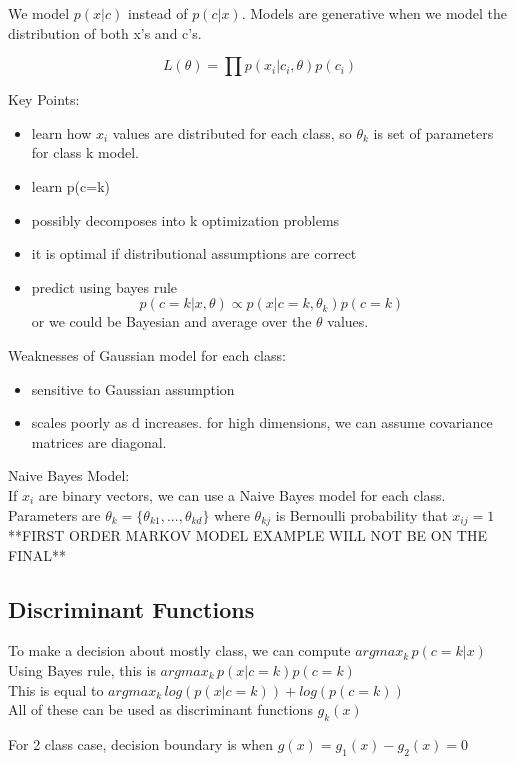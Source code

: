 \documentclass[11pt,psfig]{article}
\begin{document}
We model $p(x|c)$ instead of $p(c|x)$. Models are generative when we model the distribution of both x's and c's. 

\[
L(\theta) = \prod{p(x_i|c_i,\theta)p(c_i)}
\]

Key Points:
\begin{itemize}
\item learn how $x_i$ values are distributed for each class, so $\theta_k$ is set of parameters for class k model.
\item learn p(c=k)
\item possibly decomposes into k optimization problems
\item it is optimal if distributional assumptions are correct
\item predict using bayes rule\[
p(c=k|x,\theta)\propto p(x|c=k,\theta_k)p(c=k)
\]  or we could be Bayesian and average over the $\theta$ values. 
\end{itemize}

Weaknesses of Gaussian model for each class:
\begin{itemize}
\item sensitive to Gaussian assumption
\item scales poorly as d increases. for high dimensions, we can assume covariance matrices are diagonal. 
\end{itemize}

Naive Bayes Model:
\\
If $x_i$ are binary vectors, we can use a Naive Bayes model for each class. Parameters are $\theta_k = \{\theta_{k1},...,\theta_{kd}\}$ where $\theta_{kj}$ is Bernoulli probability that $x_{ij}=1$
\\
**FIRST ORDER MARKOV MODEL EXAMPLE WILL NOT BE ON THE FINAL**

\subsection*{Discriminant Functions}

To make a decision about mostly class, we can compute $argmax_k \,p(c=k|x)$\\
Using Bayes rule, this is $argmax_k \, p(x|c=k)p(c=k)$\\
This is equal to $argmax_k \, log(p(x|c=k)) + log(p(c=k))$
\\
All of these can be used as discriminant functions $g_k(x)$

For 2 class case, decision boundary is when $g(x) = g_1(x)-g_2(x) = 0$
\end{document}
